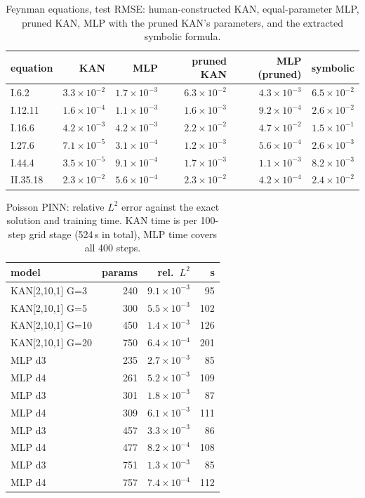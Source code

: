 \begin{table}[!htb]
\caption{Feynman equations, test RMSE: human-constructed KAN, equal-parameter MLP, pruned KAN, MLP with the pruned KAN's parameters, and the extracted symbolic formula.}\label{tab:feyn}
\centering\footnotesize
\begin{tabular}{lrrrrr}
\toprule
equation & KAN & MLP & pruned KAN & MLP (pruned) & symbolic \\
\midrule
I.6.2 & $3.3\!\times\!10^{-2}$ & $1.7\!\times\!10^{-3}$ & $6.3\!\times\!10^{-2}$ & $4.3\!\times\!10^{-3}$ & $6.5\!\times\!10^{-2}$ \\
I.12.11 & $1.6\!\times\!10^{-4}$ & $1.1\!\times\!10^{-3}$ & $1.6\!\times\!10^{-3}$ & $9.2\!\times\!10^{-4}$ & $2.6\!\times\!10^{-2}$ \\
I.16.6 & $4.2\!\times\!10^{-3}$ & $4.2\!\times\!10^{-3}$ & $2.2\!\times\!10^{-2}$ & $4.7\!\times\!10^{-2}$ & $1.5\!\times\!10^{-1}$ \\
I.27.6 & $7.1\!\times\!10^{-5}$ & $3.1\!\times\!10^{-4}$ & $1.2\!\times\!10^{-3}$ & $5.6\!\times\!10^{-4}$ & $2.6\!\times\!10^{-3}$ \\
I.44.4 & $3.5\!\times\!10^{-5}$ & $9.1\!\times\!10^{-4}$ & $1.7\!\times\!10^{-3}$ & $1.1\!\times\!10^{-3}$ & $8.2\!\times\!10^{-3}$ \\
II.35.18 & $2.3\!\times\!10^{-2}$ & $5.6\!\times\!10^{-4}$ & $2.3\!\times\!10^{-2}$ & $4.2\!\times\!10^{-4}$ & $2.4\!\times\!10^{-2}$ \\
\bottomrule
\end{tabular}
\end{table}

\begin{table}[!htb]
\caption{Poisson PINN: relative $L^2$ error against the exact solution and training time. KAN time is per 100-step grid stage (524\,s in total), MLP time covers all 400 steps.}\label{tab:pde}
\centering\footnotesize
\begin{tabular}{lrrr}
\toprule
model & params & rel.\ $L^2$ & s \\
\midrule
KAN[2,10,1] G=3 & 240 & $9.1\!\times\!10^{-3}$ & 95 \\
KAN[2,10,1] G=5 & 300 & $5.5\!\times\!10^{-3}$ & 102 \\
KAN[2,10,1] G=10 & 450 & $1.4\!\times\!10^{-3}$ & 126 \\
KAN[2,10,1] G=20 & 750 & $6.4\!\times\!10^{-4}$ & 201 \\
MLP d3 & 235 & $2.7\!\times\!10^{-3}$ & 85 \\
MLP d4 & 261 & $5.2\!\times\!10^{-3}$ & 109 \\
MLP d3 & 301 & $1.8\!\times\!10^{-3}$ & 87 \\
MLP d4 & 309 & $6.1\!\times\!10^{-3}$ & 111 \\
MLP d3 & 457 & $3.3\!\times\!10^{-3}$ & 86 \\
MLP d4 & 477 & $8.2\!\times\!10^{-4}$ & 108 \\
MLP d3 & 751 & $1.3\!\times\!10^{-3}$ & 85 \\
MLP d4 & 757 & $7.4\!\times\!10^{-4}$ & 112 \\
\bottomrule
\end{tabular}
\end{table}

